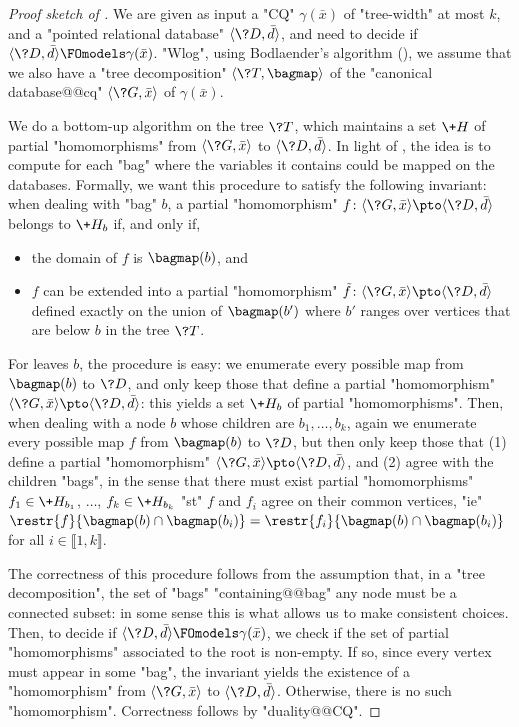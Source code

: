 \begin{proof}[Proof sketch of {}]
	We are given as input a "CQ" $\gamma(\bar x)$ of "tree-width" at most $k$,
	and a "pointed relational database" $\tup{\?D,\bar d}$, and need
	to decide if $\tup{\?D, \bar d} \FOmodels \gamma(\bar x)$.
	"Wlog", using Bodlaender's algorithm (),
	we assume that we also have a "tree decomposition" $\tup{\?T,\bagmap}$
	of the "canonical database@@cq" $\tup{\?G, \bar x}$ of $\gamma(\bar x)$.

	We do a bottom-up algorithm on the tree $\?T$,
	which maintains a set $\+H$ of partial "homomorphisms" from
	$\tup{\?G, \bar x}$ to $\tup{\?D, \bar d}$.
	In light of , the idea is to compute
	for each "bag" where the variables it contains could be mapped
	on the databases.
	Formally, we want this procedure
	to satisfy the following invariant:
	when dealing with "bag" $b$, a partial "homomorphism"
	$f\colon \tup{\?G, \bar x} \pto \tup{\?D, \bar d}$ belongs to $\+H_b$ if, and only if,
	\begin{itemize}
		\item the domain of $f$ is $\bagmap(b)$, and
		\item $f$ can be extended into a partial "homomorphism"
			$\tilde f\colon \tup{\?G, \bar x} \pto \tup{\?D, \bar d}$
			defined exactly on the union of $\bagmap(b')$ where $b'$ ranges
			over vertices that are below $b$ in the tree $\?T$.
	\end{itemize}
	For leaves $b$, the procedure is easy: we enumerate every possible map
	from $\bagmap(b)$ to $\?D$, and only keep those that define a 
	partial "homomorphism" $\tup{\?G, \bar x} \pto \tup{\?D, \bar d}$: this
	yields a set $\+H_b$ of partial "homomorphisms".
	Then, when dealing with a node $b$ whose children are $b_1,\dotsc,b_k$,
	again we enumerate every possible map $f$
	from $\bagmap(b)$ to $\?D$, but then only keep those that
	(1) define a partial "homomorphism" $\tup{\?G, \bar x} \pto \tup{\?D, \bar d}$,
	and (2) agree with the children "bags", in the sense that there must exist
	partial "homomorphisms" $f_1 \in \+H_{b_1}$, $\dotsc$, $f_k \in \+H_{b_k}$
	"st" $f$ and $f_i$ agree on their common vertices,
	"ie" $\restr{f}{\bagmap(b)\cap \bagmap(b_i)} = \restr{f_i}{\bagmap(b)\cap \bagmap(b_i)}$
	for all $i \in \lBrack 1,k\rBrack$.
	
	The correctness of this procedure follows from the assumption that,
	in a "tree decomposition", the set of "bags" "containing@@bag" any node
	must be a connected subset: in some sense this is what allows us to make
	consistent choices.
	Then, to decide if $\tup{\?D, \bar d} \FOmodels \gamma(\bar x)$,
	we check if the set of partial "homomorphisms" associated to the root
	is non-empty. If so, since every vertex must appear in some "bag",
	the invariant yields the existence of a "homomorphism" 
	from $\tup{\?G, \bar x}$ to $\tup{\?D, \bar d}$.
	Otherwise, there is no such "homomorphism". Correctness follows by "duality@@CQ".


\end{proof}
